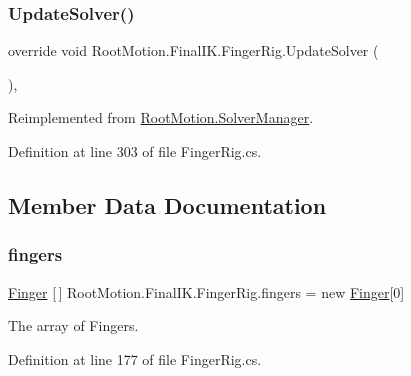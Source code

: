 \subsubsection{\texorpdfstring{Update\+Solver()}{UpdateSolver()}}
{\footnotesize\ttfamily override void Root\+Motion.\+Final\+I\+K.\+Finger\+Rig.\+Update\+Solver (\begin{DoxyParamCaption}{ }\end{DoxyParamCaption})\hspace{0.3cm}{\ttfamily [protected]}, {\ttfamily [virtual]}}



Reimplemented from \mbox{\hyperlink{class_root_motion_1_1_solver_manager_ac7a8239a700672570da89d88544a340d}{Root\+Motion.\+Solver\+Manager}}.



Definition at line 303 of file Finger\+Rig.\+cs.



\subsection{Member Data Documentation}
\mbox{\label{class_root_motion_1_1_final_i_k_1_1_finger_rig_a4e61dbcff39c1d064c3f6514c34d44d2}} 
\subsubsection{\texorpdfstring{fingers}{fingers}}
{\footnotesize\ttfamily \mbox{\hyperlink{class_root_motion_1_1_final_i_k_1_1_finger}{Finger}} \mbox{[}$\,$\mbox{]} Root\+Motion.\+Final\+I\+K.\+Finger\+Rig.\+fingers = new \mbox{\hyperlink{class_root_motion_1_1_final_i_k_1_1_finger}{Finger}}\mbox{[}0\mbox{]}}



The array of Fingers. 



Definition at line 177 of file Finger\+Rig.\+cs.

\mbox{\label{class_root_motion_1_1_final_i_k_1_1_finger_rig_a6527b263ac0f525aa90864f4f6599eb1}} 
